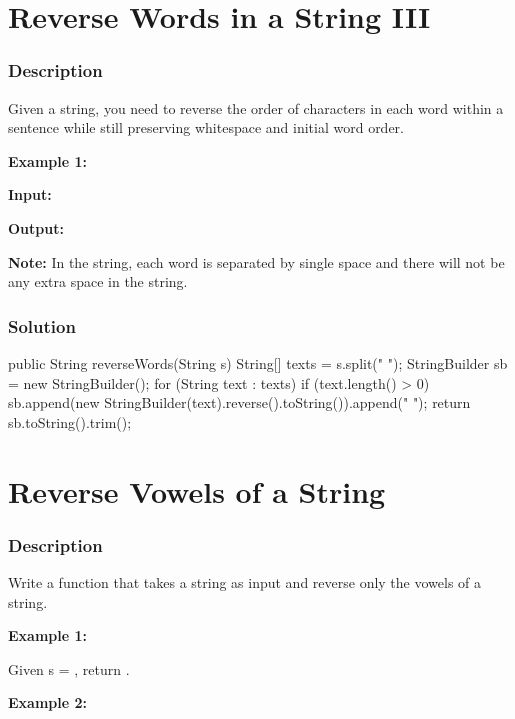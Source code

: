\newpage

\section{Reverse Words in a String III} %

\subsubsection{Description}
Given a string, you need to reverse the order of characters in each word within a sentence while still preserving whitespace and initial word order.

\textbf{Example 1:}

\textbf{Input:} 

\textbf{Output:} 

\textbf{Note:} In the string, each word is separated by single space and there will not be any extra space in the string.

\subsubsection{Solution}

\begin{Code}
public String reverseWords(String s) {
    String[] texts = s.split(" ");
    StringBuilder sb = new StringBuilder();
    for (String text : texts) {
        if (text.length() > 0) {
            sb.append(new StringBuilder(text).reverse().toString()).append(" ");
        }
    }
    return sb.toString().trim();
}
\end{Code}

\newpage

\section{Reverse Vowels of a String} %

\subsubsection{Description}
Write a function that takes a string as input and reverse only the vowels of a string.

\textbf{Example 1:}

Given s = , return .

\textbf{Example 2:}

